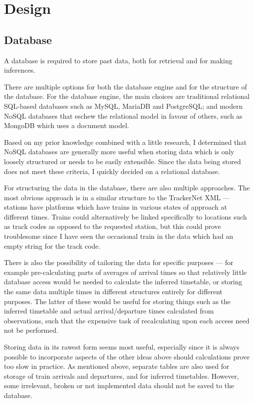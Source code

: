 \documentclass[a4paper,12pt,twoside]{report}
\begin{document}
\chapter{Design}

\section{Database}

A database is required to store past data, both for retrieval and for making
inferences.

There are multiple options for both the database engine and for the structure
of the database. For the database engine, the main choices are traditional
relational SQL-based databases such as MySQL, MariaDB and PostgreSQL; and
modern NoSQL databases that eschew the relational model in favour of others,
such as MongoDB which uses a document model.

Based on my prior knowledge combined with a little research, I determined that
NoSQL databases are generally more useful when storing data which is only
loosely structured or needs to be easily extensible. Since the data being
stored does not meet these criteria, I quickly decided on a relational
database.

For structuring the data in the database, there are also multiple approaches.
The most obvious approach is in a similar structure to the TrackerNet XML ---
stations have platforms which have trains in various states of approach at
different times. Trains could alternatively be linked specifically to locations
such as track codes as opposed to the requested station, but this could prove
troublesome since I have seen the occasional train in the data which had an
empty string for the track code.

There is also the possibility of tailoring the data for specific purposes ---
for example pre-calculating parts of averages of arrival times so that
relatively little database access would be needed to calculate the inferred
timetable, or storing the same data multiple times in different structures
entirely for different purposes. The latter of these would be useful for
storing things such as the inferred timetable and actual arrival/departure
times calculated from observations, such that the expensive task of
recalculating upon each access need not be performed.

Storing data in its rawest form seems most useful, especially since it is
always possible to incorporate aspects of the other ideas above should
calculations prove too slow in practice. As mentioned above, separate tables
are also used for storage of train arrivals and departures, and for inferred
timetables. However, some irrelevant, broken or not implemented data should not
be saved to the database.
\end{document}
